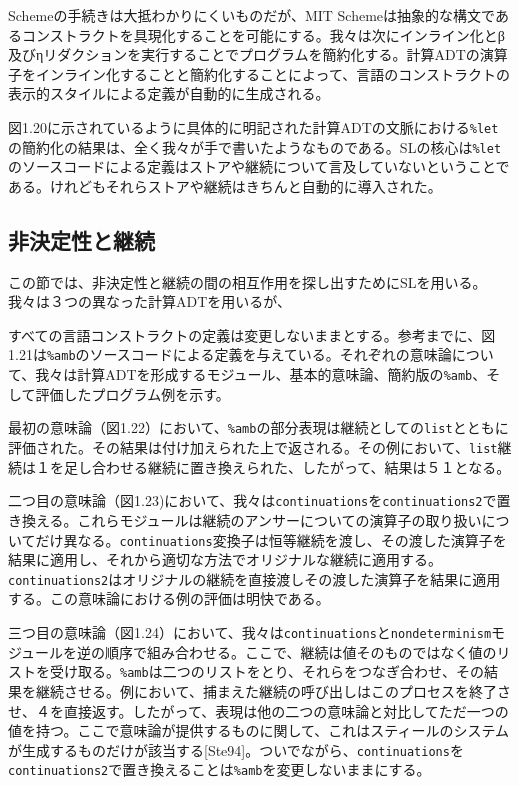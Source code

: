 \documentclass[11pt, oneside]{jsbook}   	%
\begin{document}
Schemeの手続きは大抵わかりにくいものだが、MIT Schemeは抽象的な構文であるコンストラクトを具現化することを可能にする。我々は次にインライン化とβ及びηリダクションを実行することでプログラムを簡約化する。計算ADTの演算子をインライン化することと簡約化することによって、言語のコンストラクトの表示的スタイルによる定義が自動的に生成される。

図1.20に示されているように具体的に明記された計算ADTの文脈における\verb|%let|の簡約化の結果は、全く我々が手で書いたようなものである。SLの核心は\verb|%let|のソースコードによる定義はストアや継続について言及していないということである。けれどもそれらストアや継続はきちんと自動的に導入された。
\subsection{非決定性と継続}
この節では、非決定性と継続の間の相互作用を探し出すためにSLを用いる。我々は３つの異なった計算ADTを用いるが、




すべての言語コンストラクトの定義は変更しないままとする。参考までに、図1.21は\verb|%amb|のソースコードによる定義を与えている。それぞれの意味論について、我々は計算ADTを形成するモジュール、基本的意味論、簡約版の\verb|%amb|、そして評価したプログラム例を示す。

最初の意味論（図1.22）において、\verb|%amb|の部分表現は継続としての\verb|list|とともに評価された。その結果は付け加えられた上で返される。その例において、\verb|list|継続は１を足し合わせる継続に置き換えられた、したがって、結果は５１となる。

二つ目の意味論（図1.23)において、我々は\verb|continuations|を\verb|continuations2|で置き換える。これらモジュールは継続のアンサーについての演算子の取り扱いについてだけ異なる。\verb|continuations|変換子は恒等継続を渡し、その渡した演算子を結果に適用し、それから適切な方法でオリジナルな継続に適用する。\verb|continuations2|はオリジナルの継続を直接渡しその渡した演算子を結果に適用する。この意味論における例の評価は明快である。

三つ目の意味論（図1.24）において、我々は\verb|continuations|と\verb|nondeterminism|モジュールを逆の順序で組み合わせる。ここで、継続は値そのものではなく値のリストを受け取る。\verb|%amb|は二つのリストをとり、それらをつなぎ合わせ、その結果を継続させる。例において、捕まえた継続の呼び出しはこのプロセスを終了させ、４を直接返す。したがって、表現は他の二つの意味論と対比してただ一つの値を持つ。ここで意味論が提供するものに関して、これはスティールのシステムが生成するものだけが該当する[Ste94]。ついでながら、\verb|continuations|を\verb|continuations2|で置き換えることは\verb|%amb|を変更しないままにする。

\end{document}
